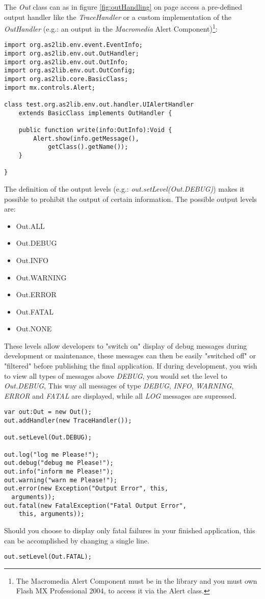 The \emph{Out} class can as in figure \ref{fig:outHandling} on page \pageref{fig:outHandling} access a pre-defined output handler like the \emph{TraceHandler} or a custom implementation of the \emph{OutHandler} (e.g.: an output in the {\sl Macromedia} Alert Component)\footnote{The Macromedia Alert Component must be in the library and you must own Flash MX Professional 2004, to access it via the Alert class.}:

\begin{lstlisting}[frame=single]
import org.as2lib.env.event.EventInfo;
import org.as2lib.env.out.OutHandler;
import org.as2lib.env.out.OutInfo;
import org.as2lib.env.out.OutConfig;
import org.as2lib.core.BasicClass;
import mx.controls.Alert;

class test.org.as2lib.env.out.handler.UIAlertHandler 
	extends BasicClass implements OutHandler {

	public function write(info:OutInfo):Void {
		Alert.show(info.getMessage(), 
			getClass().getName());
	}

}
\end{lstlisting}

The definition of the output levels (e.g.: \emph{out.setLevel(Out.DEBUG)}) makes it possible to prohibit the output of certain information.
The possible output levels are:
\begin{itemize}
	\item Out.ALL
	\item Out.DEBUG
	\item Out.INFO
	\item Out.WARNING
	\item Out.ERROR
	\item Out.FATAL
	\item Out.NONE
\end{itemize}

These levels allow developers to "switch on" display of debug messages during development or maintenance, these messages can then be easily "switched off" or "filtered" before publishing the final application. If during development, you wish to view all types of messages above \textit{DEBUG}, you would set the level to \emph{Out.DEBUG}, This way all messages of type \textit{DEBUG}, \textit{INFO}, \textit{WARNING}, \textit{ERROR} and \textit{FATAL} are displayed, while all \textit{LOG} messages are supressed. 

\begin{lstlisting}[frame=single]
var out:Out = new Out();
out.addHandler(new TraceHandler());

out.setLevel(Out.DEBUG);

out.log("log me Please!");
out.debug("debug me Please!");
out.info("inform me Please!");
out.warning("warn me Please!");
out.error(new Exception("Output Error", this, 
  arguments));
out.fatal(new FatalException("Fatal Output Error",
	this, arguments));
\end{lstlisting}

Should you choose to display only fatal failures in your finished application, this can be accomplished by changing a single line.

\begin{lstlisting}[frame=single]
out.setLevel(Out.FATAL);
\end{lstlisting}
